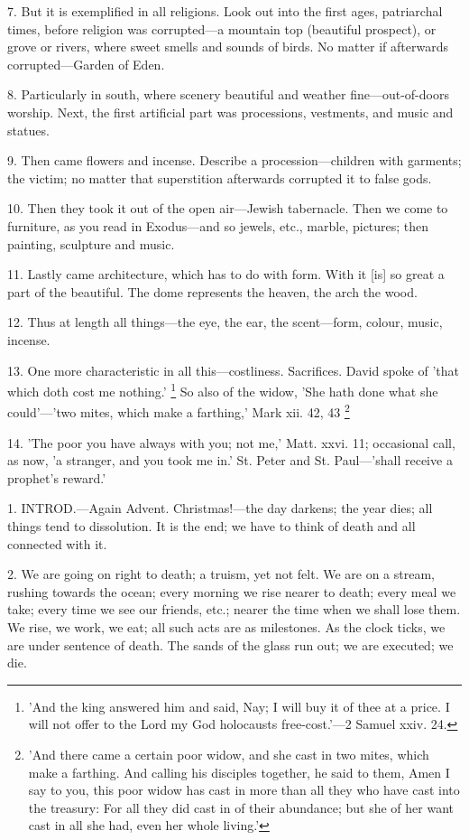 7. But it is exemplified in all religions. Look
out into the first ages, patriarchal times, before religion was
corrupted—a mountain top (beautiful prospect), or grove or rivers,
where sweet smells and sounds of birds. No matter if afterwards
corrupted—Garden of Eden.

8. Particularly in south, where scenery beautiful
and weather fine—out-of-doors worship. Next, the first artificial
part was processions, vestments, and music and statues.

9. Then came flowers and incense. Describe a
procession—children with garments; the victim; no matter that
superstition afterwards corrupted it to false gods.

10. Then they took it out of the open
air—Jewish tabernacle. Then we come to furniture, as you read in
Exodus—and so jewels, etc., marble, pictures; then painting,
sculpture and music.

11. Lastly came architecture, which has to do
with form. With it [is] so great a part of the beautiful. The dome
represents the heaven, the arch the wood.

12. Thus at length all things—the eye, the ear,
the scent—form, colour, music, incense.

13. One more characteristic in all
this—costliness. Sacrifices. David spoke of 'that which doth cost me
nothing.' \footnote{'And the king answered
him and said, Nay; I will buy it of thee at a price. I will not offer
to the Lord my God holocausts free-cost.'—2 Samuel xxiv. 24.} So also of
the widow, 'She hath done what she could'—'two mites, which make a
farthing,' Mark xii. 42, 43 \footnote{'And there came a
certain poor widow, and she cast in two mites, which make a farthing.
And calling his disciples together, he said to them, Amen I say to
you, this poor widow has cast in more than all they who have cast into
the treasury: For all they did cast in of their abundance; but she of
her want cast in all she had, even her whole living.'}

14. 'The poor you have always with you; not me,'
Matt. xxvi. 11; occasional call, as now, 'a stranger, and you took me
in.' St. Peter and St. Paul—'shall receive a prophet's reward.'


1. INTROD.—Again
Advent. Christmas!—the day darkens; the year dies; all things tend
to dissolution. It is the end; we have to think of death and all
connected with it.

2. We are going on right to death; a truism, yet
not felt. We are on a stream, rushing towards the ocean; every morning
we rise nearer to death; every meal we take; every time we see our
friends, etc.; nearer the time when we shall lose them. We rise, we
work, we eat; all such acts are as milestones. As the clock ticks, we
are under sentence of death. The sands of the glass run out; we are
executed; we die.

